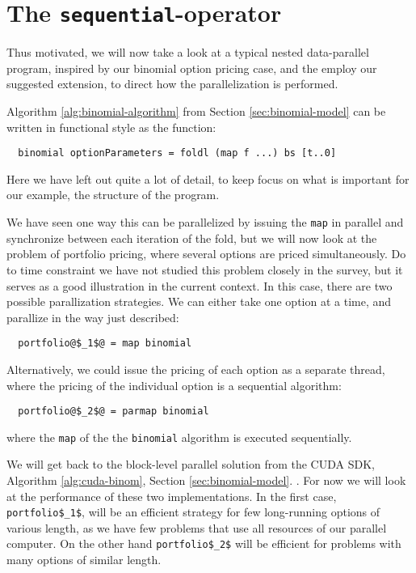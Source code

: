 \section{The \texttt{sequential}-operator}

Thus motivated, we will now take a look at a typical nested
data-parallel program, inspired by our binomial option pricing case,
and the employ our suggested extension, to direct how the
parallelization is performed.

Algorithm \ref{alg:binomial-algorithm} from Section
\ref{sec:binomial-model} can be written in functional style as the
function:
\begin{lstlisting}
  binomial optionParameters = foldl (map f ...) bs [t..0]
\end{lstlisting}
Here we have left out quite a lot of detail, to keep focus on what is
important for our example, the structure of the program.

We have seen one way this can be parallelized by issuing the
\lstinline{map} in parallel and synchronize between each
iteration of the fold, but we will now look at the problem of
portfolio pricing, where several options are priced simultaneously. Do
to time constraint we have not studied this problem closely in the
survey, but it serves as a good illustration in the current
context. In this case, there are two possible parallization
strategies. We can either take one option at a time, and parallize in
the way just described:
\begin{lstlisting}
  portfolio@$_1$@ = map binomial
\end{lstlisting}
Alternatively, we could issue the pricing of each option as a separate
thread, where the pricing of the individual option is a sequential algorithm:
\begin{lstlisting}
  portfolio@$_2$@ = parmap binomial
\end{lstlisting}
where the \lstinline{map} of the the \lstinline{binomial} algorithm is
executed sequentially.

We will get back to the block-level parallel solution from the CUDA
SDK, Algorithm \ref{alg:cuda-binom}, Section
\ref{sec:binomial-model}. . For now we will look at the performance of these two
implementations. In the first case, \lstinline[mathescape]{portfolio$_1$}, will
be an efficient strategy for few long-running options of various
length, as we have few problems that use all resources of our parallel
computer. On the other hand \lstinline[mathescape]{portfolio$_2$} will be
efficient for problems with many options of similar
length. 

